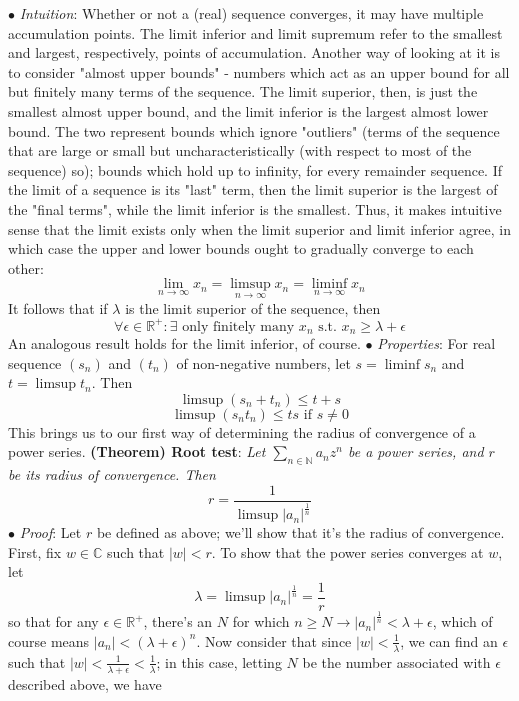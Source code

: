 \documentclass{article}
\newcommand*{\tb}{\textbf}
\newcommand*{\ti}{\textit}
\newcommand*{\n}{\newline}
\newcommand*{\nn}{\newline \newline}
\newcommand*{\Pf}{\indent \ensuremath{\bullet} \textit{Proof}: }
\newcommand*{\In}{\indent \ensuremath{\bullet} \textit{Intuition}: }
\newcommand*{\N}{\mathbb{N}}
\newcommand*{\R}{\mathbb{R}}
\newcommand*{\C}{\mathbb{C}}
\newcommand*{\st}{\text{ s.t. }}
\begin{document}
\In Whether or not a (real) sequence converges, it may have multiple accumulation points. The limit inferior and limit supremum refer to the smallest and largest, respectively, points of accumulation. Another way of looking at it is to consider "almost upper bounds" - numbers which act as an upper bound for all but finitely many terms of the sequence. The limit superior, then, is just the smallest almost upper bound, and the limit inferior is the largest almost lower bound. The two represent bounds which ignore "outliers" (terms of the sequence that are large or small but uncharacteristically (with respect to most of the sequence) so); bounds which hold up to infinity, for every remainder sequence. If the limit of a sequence is its "last" term, then the limit superior is the largest of the "final terms", while the limit inferior is the smallest. Thus, it makes intuitive sense that the limit exists only when the limit superior and limit inferior agree, in which case the upper and lower bounds ought to gradually converge to each other:
    $$ \lim_{n \to \infty} x_n = \limsup_{n \to \infty} x_n = \liminf_{n \to \infty} x_n $$
It follows that if $ \lambda $ is the limit superior of the sequence, then
    $$ \forall \epsilon \in \R^+: \exists \text{ only finitely many } x_n \st x_n \geq \lambda + \epsilon $$
An analogous result holds for the limit inferior, of course.
\n
\indent $ \bullet $ \ti{Properties}: For real sequence $ ( s_n ) $ and $ ( t_n ) $ of non-negative numbers, let $ s = \liminf s_n $ and $ t = \limsup t_n $. Then
    $$ \limsup (s_n + t_n) \leq t + s $$
    $$ \limsup (s_n t_n) \leq t s \text{ if } s \neq 0 $$
\nn
This brings us to our first way of determining the radius of convergence of a power series.
\nn
\tb{(Theorem) Root test}: \ti{Let $ \sum_{n \in \N} a_n z^n $ be a power series, and $ r $ be its radius of convergence. Then}
    $$ r = \frac{1}{\limsup | a_n |^{\frac{1}{n}}} $$
\Pf Let $ r $ be defined as above; we'll show that it's the radius of convergence. First, fix $ w \in \C $ such that $ | w | < r $. To show that the power series converges at $ w $, let 
    $$ \lambda = \limsup | a_n |^{\frac{1}{n}} = \frac{1}{r} $$
so that for any $ \epsilon \in \R^+ $, there's an $ N $ for which $ n \geq N \rightarrow | a_n |^{\frac{1}{n}} < \lambda + \epsilon $, which of course means $ | a_n | < (\lambda + \epsilon)^n $. Now consider that since $ | w | < \frac{1}{\lambda} $, we can find an $ \epsilon $ such that $ | w | < \frac{1}{\lambda + \epsilon} < \frac{1}{\lambda} $; in this case, letting $ N $ be the number associated with $ \epsilon $ described above, we have
\end{document}
